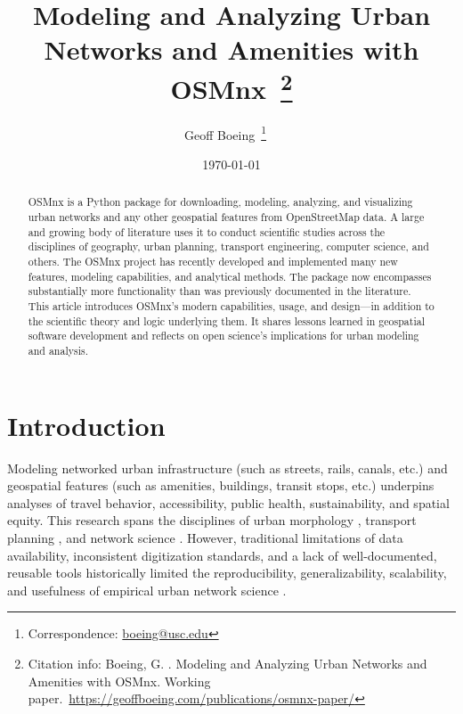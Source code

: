 \documentclass[12pt,letterpaper]{article} %
\makeatletter
\newcommand{\myname}{Geoff Boeing}
\newcommand{\myemail}{boeing@usc.edu}
\newcommand{\myaffiliation}{University of Southern California}
\newcommand{\paperdate}{\monthyeardate\today}
\newcommand{\papertitle}{Modeling and Analyzing Urban Networks and Amenities with OSMnx}
\newcommand{\papercitation}{Boeing, G. \the\year. \papertitle. Working paper.\ \href{https://geoffboeing.com/publications/osmnx-paper/}{https://geoffboeing.com/publications/osmnx-paper/}}
\makeatother
\begin{document}
\title{\papertitle~\footnote{Citation info: \papercitation}}
\author[]{\myname~\footnote{Correspondence: \href{mailto:\myemail}{\myemail}}~~}
\affil[]{\myaffiliation}
\date{\paperdate}

\maketitle

\begin{abstract}

OSMnx is a Python package for downloading, modeling, analyzing, and visualizing urban networks and any other geospatial features from OpenStreetMap data. A large and growing body of literature uses it to conduct scientific studies across the disciplines of geography, urban planning, transport engineering, computer science, and others. The OSMnx project has recently developed and implemented many new features, modeling capabilities, and analytical methods. The package now encompasses substantially more functionality than was previously documented in the literature. This article introduces OSMnx's modern capabilities, usage, and design---in addition to the scientific theory and logic underlying them. It shares lessons learned in geospatial software development and reflects on open science's implications for urban modeling and analysis.

\end{abstract}

\section{Introduction}

Modeling networked urban infrastructure (such as streets, rails, canals, etc.) and geospatial features (such as amenities, buildings, transit stops, etc.) underpins analyses of travel behavior, accessibility, public health, sustainability, and spatial equity. This research spans the disciplines of urban morphology \citep[e.g.,][]{gervasoni_calculating_2017,dacci_signature_2019,coutrot_entropy_2022}, transport planning \citep[e.g.,][]{merchan_quantifying_2020,liao_disparities_2020,natera_orozco_data-driven_2020}, and network science \citep[e.g.,][]{feng_spatial_2020,yin_multi-task_2020,young_automatic_2020}. However, traditional limitations of data availability, inconsistent digitization standards, and a lack of well-documented, reusable tools historically limited the reproducibility, generalizability, scalability, and usefulness of empirical urban network science \citep{liu_generalized_2022}.
\end{document}
